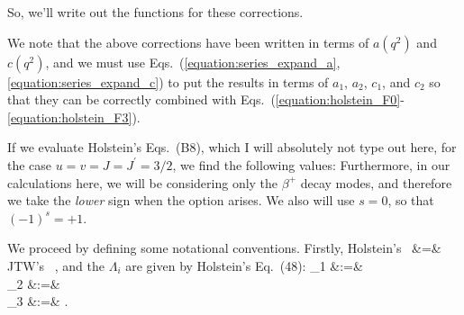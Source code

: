

So, we'll write out the functions for these corrections.  
\unskip
\unskip
\unskip

We note that the above corrections have been written in terms of $a(q^2)$ and $c(q^2)$, and we must use Eqs.~(\ref{equation:series_expand_a}, \ref{equation:series_expand_c}) to put the results in terms of $a_1$,  $a_2$, $c_1$, and $c_2$ so that they can be correctly combined with Eqs.~(\ref{equation:holstein_F0}-\ref{equation:holstein_F3}).

If we evaluate Holstein's Eqs.~(B8), which I will absolutely not type out here, for the case $u=v=J=J^\prime=3/2$, we find the following values:
\unskip  %
Furthermore, in our calculations here, we will be considering only the $\beta^+$ decay modes, and therefore we take the \emph{lower} sign when the option arises.  We also will use $s=0$, so that $(-1)^s = +1$.



We proceed by defining some notational conventions.  Firstly, 
\bea
\textrm{Holstein's \,}  &=& \textrm{JTW's \,} ,
\label{eq:nequalsj}
\eea
and the 
$\Lambda_i$ are given by Holstein's Eq.~(48):
\bea
    \Lambda_1   &:=& \LambdaOne   
    \label{eq:lambda1} \\
    \Lambda_2   &:=& \LambdaTwo 
    \label{eq:lambda2} \\
    \Lambda_3   &:=& \LambdaThree .
    \label{eq:lambda3}
\eea

